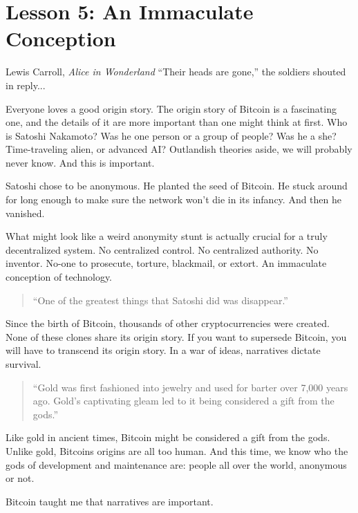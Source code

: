 \chapter{Lesson 5: An Immaculate Conception}
\label{les:5}

\begin{chapquote}{Lewis Carroll, \textit{Alice in Wonderland}}
``Their heads are gone,'' the soldiers shouted in reply...
\end{chapquote}

Everyone loves a good origin story. The origin story of Bitcoin is a
fascinating one, and the details of it are more important than one might
think at first. Who is Satoshi Nakamoto? Was he one person or a group of
people? Was he a she? Time-traveling alien, or advanced AI? Outlandish
theories aside, we will probably never know. And this is important.

Satoshi chose to be anonymous. He planted the seed of Bitcoin. He stuck
around for long enough to make sure the network won't die in its
infancy. And then he vanished.

What might look like a weird anonymity stunt is actually crucial for a
truly decentralized system. No centralized control. No centralized
authority. No inventor. No-one to prosecute, torture, blackmail, or
extort. An immaculate conception of technology.

\begin{quotation}
``One of the greatest things that Satoshi did was disappear.''
\end{quotation}

Since the birth of Bitcoin, thousands of other cryptocurrencies were
created. None of these clones share its origin story. If you want to
supersede Bitcoin, you will have to transcend its origin story. In a war
of ideas, narratives dictate survival.

\begin{quotation}
``Gold was first fashioned into jewelry and used for barter over 7,000
years ago. Gold's captivating gleam led to it being considered a gift
from the gods.''
\end{quotation}

Like gold in ancient times, Bitcoin might be considered a gift from the
gods. Unlike gold, Bitcoins origins are all too human. And this time, we
know who the gods of development and maintenance are: people all over
the world, anonymous or not.

Bitcoin taught me that narratives are important.

%
%
%
%
